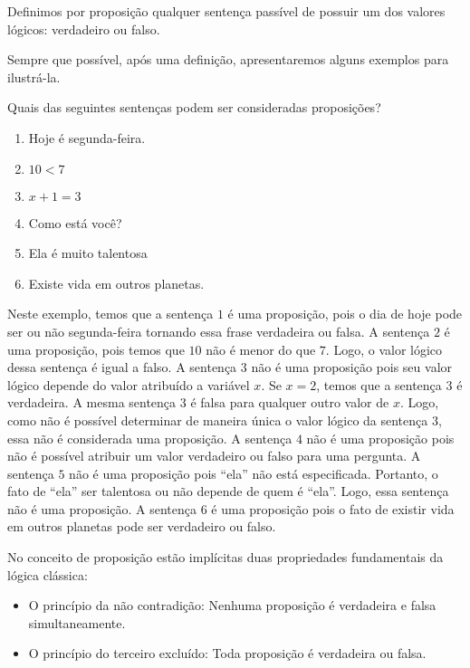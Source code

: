 \begin{Definition}[Proposi\c{c}\~ao]
  Definimos por proposi\c{c}\~ao qualquer senten\c{c}a pass\'ivel de possuir um dos valores l\'ogicos: verdadeiro ou falso.
\end{Definition}

Sempre que poss\'ivel, ap\'os uma defini\c{c}\~ao, apresentaremos alguns exemplos para ilustr\'a-la.

\begin{Example}
  Quais das seguintes senten\c{c}as podem ser consideradas proposi\c{c}\~oes?
  \begin{enumerate}
    \item Hoje \'e segunda-feira.
    \item $10 < 7$
    \item $x + 1 = 3$
    \item Como est\'a voc\^e?
    \item Ela \'e muito talentosa
    \item Existe vida em outros planetas.
  \end{enumerate}
  Neste exemplo, temos que a senten\c{c}a $1$ \'e uma proposi\c{c}\~ao, pois o dia de hoje pode ser ou n\~ao segunda-feira tornando essa frase
  verdadeira ou falsa. A senten\c{c}a $2$ \'e uma proposi\c{c}\~ao, pois temos que $10$ n\~ao \'e menor do que $7$. Logo, o valor l\'ogico dessa
  senten\c{c}a \'e igual a falso. A senten\c{c}a $3$ n\~ao \'e uma proposi\c{c}\~ao pois seu valor l\'ogico depende do valor atribu\'ido a
  vari\'avel $x$. Se $x = 2$, temos que a senten\c{c}a $3$ \'e verdadeira. A mesma senten\c{c}a $3$ \'e falsa para qualquer outro valor de $x$.
  Logo, como n\~ao \'e poss\'ivel determinar de maneira \'unica o valor l\'ogico da senten\c{c}a $3$, essa n\~ao \'e considerada uma
  proposi\c{c}\~ao.
  A senten\c{c}a $4$ n\~ao \'e uma proposi\c{c}\~ao pois n\~ao \'e poss\'ivel atribuir um valor verdadeiro ou falso para uma pergunta.
  A senten\c{c}a $5$ n\~ao \'e uma proposi\c{c}\~ao pois ``ela'' n\~ao est\'a especificada. Portanto, o fato de ``ela'' ser talentosa ou n\~ao
  depende de quem \'e ``ela''. Logo, essa senten\c{c}a n\~ao \'e uma proposi\c{c}\~ao.
  A senten\c{c}a $6$ \'e uma proposi\c{c}\~ao pois o fato de existir vida em outros planetas pode ser verdadeiro ou falso.
\end{Example}

No conceito de proposi\c{c}\~ao est\~ao impl\'icitas duas propriedades fundamentais da l\'ogica cl\'assica:
\begin{itemize}
  \item O princ\'ipio da n\~ao contradi\c{c}\~ao: Nenhuma proposi\c{c}\~ao \'e verdadeira e falsa simultaneamente.
  \item O princ\'ipio do terceiro exclu\'ido: Toda proposi\c{c}\~ao \'e verdadeira ou falsa.
\end{itemize}

